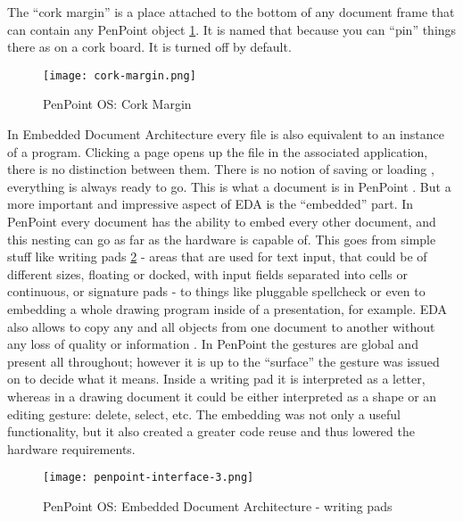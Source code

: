 The ``cork margin'' is a place attached to the bottom of any document frame that
can contain any PenPoint object \ref{fig:cork-margin}. It is named that because
you can ``pin'' things there as on a cork board. It is turned off by default.

\begin{figure}[!h]
    \centering \texttt{[image: cork-margin.png]}
    \caption{PenPoint OS: Cork Margin}
    \label{fig:cork-margin}
\end{figure}

In Embedded Document Architecture every file is also equivalent to an instance
of a program. Clicking a page opens up the file in the associated application,
there is no distinction between them. There is no notion of saving or loading
\cite{startupadv}, everything is always ready to go. This is what a document is
in PenPoint \cite{carr1991} \cite{brown1992}. But a more important and
impressive aspect of EDA is the ``embedded'' part. In PenPoint every document
has the ability to embed every other document, and this nesting can go as far
as the hardware is capable of. This goes from simple stuff like writing pads
\ref{fig:embedded-document-architecture} - areas that are used for text input,
that could be of different sizes, floating or docked, with input fields
separated into cells or continuous, or signature pads - to things like
pluggable spellcheck or even to embedding a whole drawing program inside of
a presentation, for example.  EDA also allows to copy any and all objects from
one document to another without any loss of quality or information
\cite{carr1991} \cite{brown1993}. In PenPoint the gestures are global and
present all throughout; however it is up to the ``surface'' the gesture was issued
on to decide what it means. Inside a writing pad it is interpreted as a letter,
whereas in a drawing document it could be either interpreted as a shape or an
editing gesture: delete, select, etc. The embedding was not only a useful
functionality, but it also created a greater code reuse and thus lowered the
hardware requirements.

\begin{figure}[!h]
    \centering \texttt{[image: penpoint-interface-3.png]}
    \caption{PenPoint OS: Embedded Document Architecture - writing pads}
    \label{fig:embedded-document-architecture}
\end{figure}

